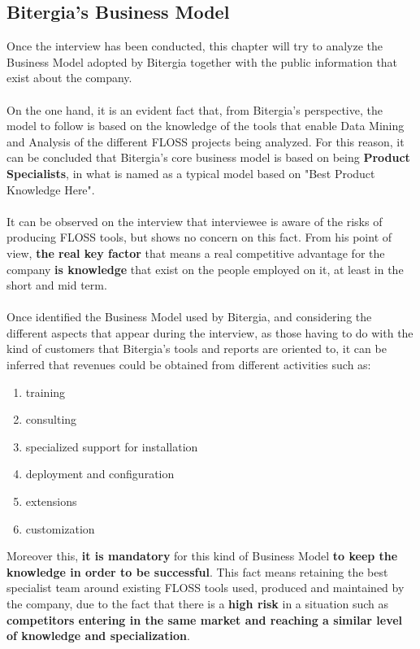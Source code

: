 \documentclass[11pt]{article}
\begin{document}
\subsection{Bitergia's Business Model}
Once the interview has been conducted, this chapter will try to analyze the Business Model adopted by Bitergia together with the public information that exist about the company.\\
\\
On the one hand, it is an evident fact that, from Bitergia's perspective, the model to follow is based on the knowledge of the tools that enable Data Mining and Analysis of the different FLOSS projects being analyzed. For this reason, it can be concluded that Bitergia's core business model is based on being \textbf{Product Specialists}, in what is named as a typical model based on "Best Product Knowledge Here".\\
\\
It can be observed on the interview that interviewee is aware of the risks of producing FLOSS tools, but shows no concern on this fact. From his point of view, \textbf{the real key factor} that means a real competitive advantage for the company \textbf{is knowledge} that exist on the people employed on it, at least in the short and mid term.\\
\\
Once identified the Business Model used by Bitergia, and considering the different aspects that appear during the interview, as those having to do with the kind of customers that Bitergia's tools and reports are oriented to, it can be inferred that revenues could be obtained from different activities such as:
\begin{enumerate}\itemsep0.2pt
\item {training}
\item {consulting}
\item {specialized support for
installation}
\item {deployment and configuration}
\item {extensions}
\item {customization}
\end{enumerate}
Moreover this, \textbf{it is mandatory} for this kind of Business Model \textbf{to keep the knowledge in order to be successful}. This fact means retaining the best specialist team around existing FLOSS tools used, produced and maintained by the company, due to the fact that there is a \textbf{high risk} in a situation such as \textbf{competitors entering in the same market and reaching a similar level of knowledge and specialization}.
\end{document}
